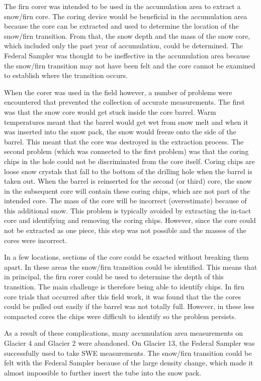 \documentclass{sfuthesis}
\begin{document}
The firn corer was intended to be used in the accumulation area to extract a snow/firn core. The coring device would be beneficial in the accumulation area because the core can be extracted and used to determine the location of the snow/firn transition. From that, the snow depth and the mass of the snow core, which included only the past year of accumulation, could be determined. The Federal Sampler was thought to be ineffective in the accumulation area because the snow/firn transition may not have been felt and the core cannot be examined to establish where the transition occurs.

When the corer was used in the field however, a number of problems were encountered that prevented the collection of accurate measurements. The first was that the snow core would get stuck inside the core barrel. Warm temperatures meant that the barrel would get wet from snow melt and when it was inserted into the snow pack, the snow would freeze onto the side of the barrel. This meant that the core was destroyed in the extraction process. The second problem (which was connected to the first problem) was that the coring chips in the hole could not be discriminated from the core itself. Coring chips are loose snow crystals that fall to the bottom of the drilling hole when the barrel is taken out. When the barrel is reinserted for the second (or third) core, the snow in the subsequent core will contain these coring chips, which are not part of the intended core. The mass of the core will be incorrect (overestimate) because of this additional snow. This problem is typically avoided by extracting the in-tact core and identifying and removing the coring chips. However, since the core could not be extracted as one piece, this step was not possible and the masses of the cores were incorrect. 

In a few locations, sections of the core could be exacted without breaking them apart. In these areas the snow/firn transition could be identified. This means that in principal, the firn corer could be used to determine the depth of this transition. The main challenge is therefore being able to identify chips. In firn core trials that occurred after this field work, it was found that the the cores could be pulled out easily if the barrel was not totally full. However, in these less compacted cores the chips were difficult to identify so the problem persists. 

As a result of these complications, many accumulation area measurements on Glacier 4 and Glacier 2 were abandoned. On Glacier 13, the Federal Sampler was successfully used to take SWE measurements. The snow/firn transition could be felt with the Federal Sampler because of the large density change, which made it almost impossible to further insert the tube into the snow pack.  
\end{document}
